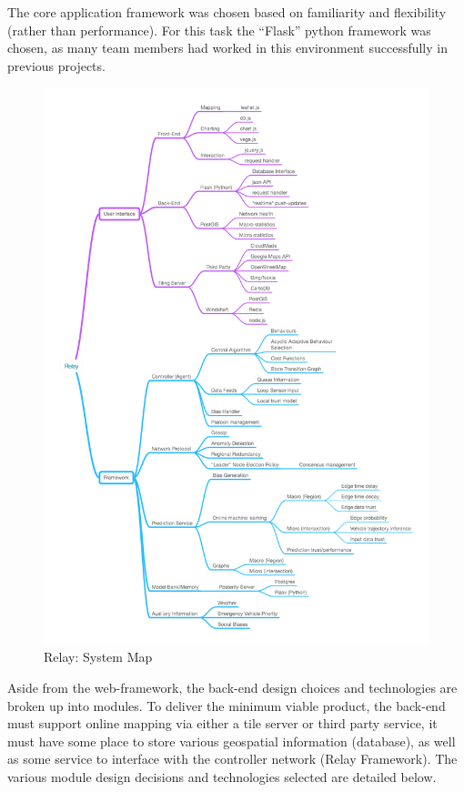 \documentclass{report}
\begin{document}
The core application framework was chosen based on familiarity and flexibility (rather than performance).
For this task the ``Flask'' python framework was chosen, as many team members had worked in this environment successfully in previous projects.

\begin{figure}[H]
  \begin{centering}
    \includegraphics[scale=0.3]{figures/flow-chart.png}
    \caption{Relay: System Map}
    \label{fig:Back_end_system_map}
  \end{centering}
\end{figure}

Aside from the web-framework, the back-end design choices and technologies are broken up into modules.
To deliver the minimum viable product, the back-end must support online mapping via either a tile server or third party service, it must have some place to store various geospatial information (database), as well as some service to interface with the controller network (Relay Framework).
The various module design decisions and technologies selected are detailed below.
\end{document}
